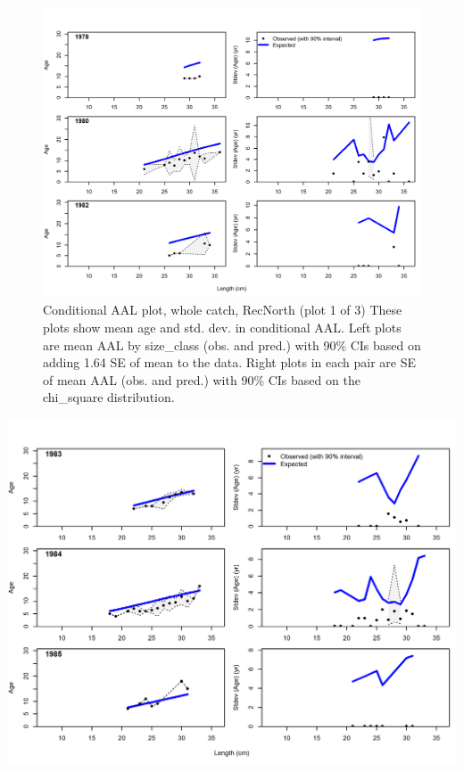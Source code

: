 \documentclass[12pt,]{article}
\begin{document}
\begin{figure}
\centering
\includegraphics{./r4ss/plots_mod1/comp_condAALfit_Andre_plotsflt3mkt0_page1.png}
\caption{Conditional AAL plot, whole catch, RecNorth (plot 1 of 3) These
plots show mean age and std. dev. in conditional AAL. Left plots are
mean AAL by size\_class (obs. and pred.) with 90\% CIs based on adding
1.64 SE of mean to the data. Right plots in each pair are SE of mean AAL
(obs. and pred.) with 90\% CIs based on the chi\_square distribution.
\label{fig:mod1_9_comp_condAALfit_Andre_plotsflt3mkt0_page1}}
\end{figure}

\includegraphics{./r4ss/plots_mod1/comp_condAALfit_Andre_plotsflt3mkt0_page2.png}
\end{document}
